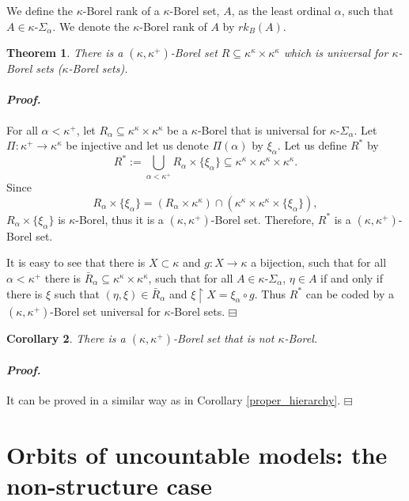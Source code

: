 \documentclass[12pt,a4paper]{amsart}
\newtheorem{thm}{Theorem}[section]
\newtheorem{cor}[thm]{Corollary}
\theoremstyle{definition}
\theoremstyle{remark}
\renewcommand{\restriction}{\mathbin\upharpoonright}
\newenvironment{cproof}{\paragraph{\emph{Proof.\,}}}{\hfill{$\boxminus$}\par\vspace{2mm}}
\begin{document}
We define the $\kappa$-Borel rank of a $\kappa$-Borel set, $A$, as the least ordinal $\alpha$, such that $A\in \kappa\text{-}\Sigma_\alpha$. We denote the $\kappa$-Borel rank of $A$ by $rk_B(A)$.

\begin{thm}
    There is a $(\kappa,\kappa^+)$-Borel set $R\subseteq \kappa^\kappa\times\kappa^\kappa$ which is universal for $\kappa$-Borel sets ($\kappa$-Borel sets).
\end{thm}
\begin{cproof}
    For all $\alpha<\kappa^+$, let $R_\alpha\subseteq \kappa^\kappa\times\kappa^\kappa$ be a $\kappa$-Borel that is universal for $\kappa\text{-}\Sigma_{\alpha}$. Let $\Pi:\kappa^+\rightarrow\kappa^\kappa$ be injective and let us denote $\Pi(\alpha)$ by $\xi_\alpha$. Let us define $R^*$ by $$R^*:=\bigcup_{\alpha<\kappa^+}R_\alpha\times\{\xi_\alpha\}\subseteq \kappa^\kappa\times\kappa^\kappa\times\kappa^\kappa.$$
    Since $$R_\alpha\times\{\xi_\alpha\}=(R_\alpha\times\kappa^\kappa)\cap (\kappa^\kappa\times\kappa^\kappa\times \{\xi_\alpha\}),$$ $R_\alpha\times\{\xi_\alpha\}$ is $\kappa$-Borel, thus it is a  $(\kappa,\kappa^+)$-Borel set. Therefore, $R^*$ is a $(\kappa,\kappa^+)$-Borel set.

    It is easy to see that there is $X\subset\kappa$ and $g:X\rightarrow\kappa$ a bijection, such that for all $\alpha<\kappa^+$ there is $\bar{R}_\alpha\subseteq \kappa^\kappa\times\kappa^\kappa$, such that for all $A\in \kappa$-$\Sigma_\alpha$, $\eta\in A$ if and only if there is $\xi$ such that $(\eta,\xi)\in \bar{R}_\alpha$ and $\xi\restriction X=\xi_\alpha\circ g$. Thus $R^*$ can be coded by a $(\kappa,\kappa^+)$-Borel set universal for $\kappa$-Borel sets.
\end{cproof}

\begin{cor}
    There is a $(\kappa,\kappa^+)$-Borel set that is not $\kappa$-Borel.
\end{cor}
\begin{cproof}
    It can be proved in a similar way as in Corollary \ref{proper_hierarchy}.
\end{cproof}




\section{Orbits of uncountable models: the non-structure case}
\end{document}
